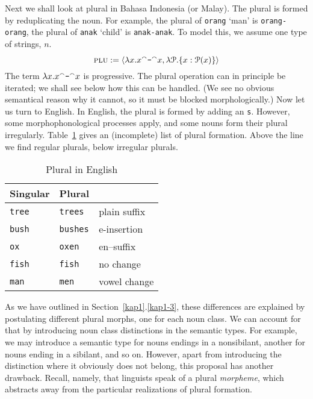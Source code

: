 Next we shall look at plural in Bahasa Indonesia (or Malay).
The plural is formed by reduplicating the noun. For example,
the plural of {\tt orang} `man' is {\tt orang-orang},
the plural of {\tt anak} `child' is {\tt anak-anak}. To
model this, we assume one type of strings, $n$.
\begin{equation}
\mbox{\sc plu} := \langle \lambda x. x{^{\smallfrown}}\mbox{\tt -}{^{\smallfrown}} x,
    \lambda \mathcal{P}. \{x : \mathcal{P}(x)\}\rangle
\end{equation}
The term $\lambda x.x{^{\smallfrown}}\mbox{\tt -}{^{\smallfrown}} x$ is progressive.
The plural operation can in principle be iterated; we shall see 
below how this can be handled. (We see no obvious semantical 
reason why it cannot, so it must be blocked morphologically.) 
Now let us turn to English. In English, the
plural is formed by adding an {\tt s}. However, some
morphophonological processes apply, and some nouns form their
plural irregularly. Table~\ref{tab:engplu} gives an (incomplete) 
list of plural formation. Above the line we find regular plurals, 
below irregular plurals.
\begin{table}
\caption{Plural in English}
\label{tab:engplu}
\begin{center}
\begin{tabular}{|l|l|l|}
\hline
Singular & Plural & \\\hline
{\tt tree} & {\tt trees} & plain suffix \\
{\tt bush} & {\tt bushes} & e-insertion \\\hline
{\tt ox}   & {\tt oxen} & en--suffix \\
{\tt fish} & {\tt fish} & no change \\
{\tt man}  & {\tt men}  & vowel change \\\hline
\end{tabular}
\end{center}
\end{table}
As we have outlined in Section~\ref{kap1}.\ref{kap1-3}, these differences are
explained by postulating different plural morphs, one for each noun
class. We can account for that by introducing noun class distinctions
in the semantic types. For example, we may introduce a semantic type
for nouns endings in a nonsibilant, another for nouns ending in a
sibilant, and so on. However, apart from introducing the distinction
where it obviously does not belong, this proposal has another drawback.
Recall, namely, that linguists speak of a plural {\it morpheme}, which
abstracts away from the particular realizations of plural formation.
